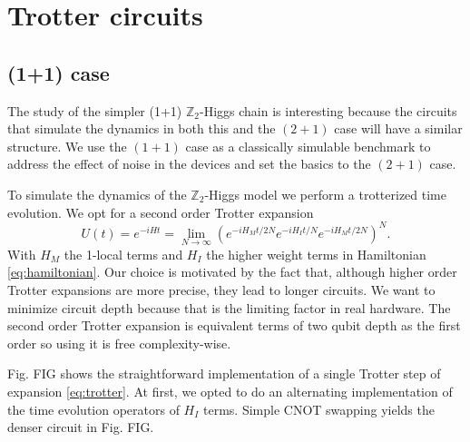 \documentclass[a4paper]{article}
\begin{document}
\section{Trotter circuits}

\subsection{(1+1) case}

The study of the simpler (1+1) $\mathbb{Z}_2$-Higgs chain is interesting because the circuits that simulate the dynamics in both this and the $(2+1)$ case will have a similar structure. We use the $(1+1)$ case as a classically simulable benchmark to address the effect of noise in the devices and set the basics to the $(2+1)$ case.

To simulate the dynamics of the $\mathbb{Z}_2$-Higgs model we perform a trotterized time evolution. We opt for a second order Trotter expansion
%
\begin{equation}
    U(t) = e^{-i H t} = \lim_{N \to \infty}\left( e^{-i H_M t/2N} e^{-i H_I t/N} e^{-i H_M t/2N} \right)^N.
    \label{eq:trotter}
\end{equation}
%
With $H_M$ the 1-local terms and $H_I$ the higher weight terms in Hamiltonian \eqref{eq:hamiltonian}. Our choice is motivated by the fact that, although higher order Trotter expansions are more precise, they lead to longer circuits. We want to minimize circuit depth because that is the limiting factor in real hardware. The second order Trotter expansion is equivalent terms of two qubit depth as the first order so using it is free complexity-wise.

Fig. FIG shows the straightforward implementation of a single Trotter step of expansion \eqref{eq:trotter}. At first, we opted to do an alternating implementation of the time evolution operators of $H_I$ terms. Simple CNOT swapping yields the denser circuit in Fig. FIG.
\end{document}
